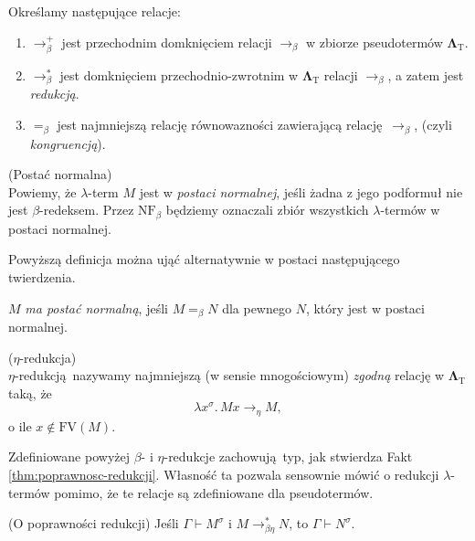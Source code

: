 \noindent Określamy następujące relacje:
\begin{enumerate}[label=B\arabic*.]
\item    \(\longrightarrow^{+}_{\beta}\) jest przechodnim domknięciem relacji \(\longrightarrow_{\beta}\) w zbiorze pseudotermów \(\mathbf{\Lambda}_{\mathrm{T}}\).

\item    \(\longrightarrow^{*}_{\beta}\) jest domknięciem przechodnio-zwrotnim w \(\mathbf{\Lambda}_{\mathrm{T}}\) relacji \(\longrightarrow_{\beta}\), a zatem jest \emph{redukcją}. 

\item    \(=_{\beta}\) jest najmniejszą relację równowazności zawierającą relację \(\longrightarrow_{\beta}\), (czyli \emph{kongruencją}).
\end{enumerate}

\begin{definicja}\label{def:postac-normalna}(Postać normalna)\\
  Powiemy, że \(\lambda\)-term \(M\) jest w \emph{postaci normalnej}, jeśli żadna z jego podformuł nie jest \(\beta\)-redeksem. Przez \(\mathrm{NF}_{\beta}\) będziemy oznaczali zbiór wszystkich \(\lambda\)-termów w postaci normalnej.
\end{definicja}    
Powyższą definicja można ująć alternatywnie w postaci następującego twierdzenia.
\begin{fakt}\label{thm:postac-normalna-alt}
\(M\) \emph{ma postać normalną}, jeśli \(M=_{\beta}N\) dla pewnego \(N\), który jest w postaci normalnej.
\end{fakt}
 
  \begin{definicja}(\(\eta\)-redukcja)\\
\(\eta\)-redukcją nazywamy najmniejszą (w sensie mnogościowym) \emph{zgodną} relację w \(\mathbf{\Lambda}_{\mathrm{T}}\) taką, że
  \[
    \lambda x^\sigma.\, Mx\longrightarrow_{\eta} M,
  \]
    o ile \(x\not\in \mathrm{FV}(M)\).
  \end{definicja}

Zdefiniowane powyżej  \(\beta\)- i \(\eta\)-redukcje zachowują typ, jak stwierdza Fakt \ref{thm:poprawnosc-redukcji}. Własność ta pozwala sensownie mówić o redukcji \(\lambda\)-termów pomimo, że te relacje są zdefiniowane dla pseudotermów.
\begin{fakt}\label{thm:poprawnosc-redukcji}(O poprawności redukcji) 
  Jeśli \(\Gamma\vdash M^\sigma\) i \(M\longrightarrow^{*}_{\beta\eta}N\), to
  \(\Gamma\vdash N^\sigma\).
\end{fakt}
 
